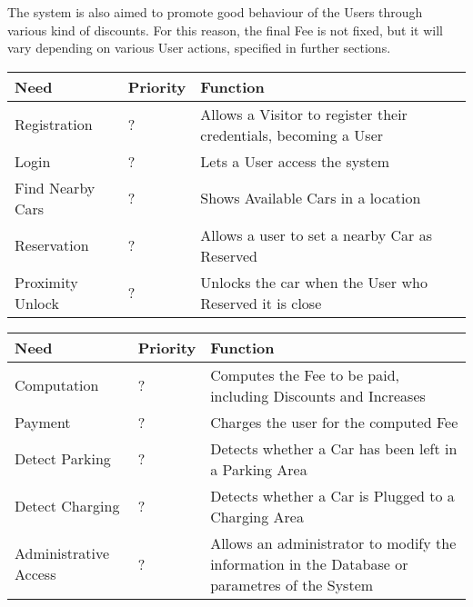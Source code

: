 The system is also aimed to promote good behaviour of the Users through various kind of discounts. For this reason, the final Fee is not fixed, but it will vary depending on various User actions, specified in further sections.

\begin{center}
  \begin{longtable}{|p{}|p{}|p{}|}
    \hline
    \textbf{Need} & \textbf{Priority} & \textbf{Function} \\ \hline
    Registration & ? & Allows a Visitor to register their credentials, becoming a User \\ \hline
    Login & ? & Lets a User access the system \\ \hline
    Find Nearby Cars & ? & Shows Available Cars in a location \\ \hline
    Reservation & ? & Allows a user to set a nearby Car as Reserved \\ \hline
    Proximity Unlock & ? & Unlocks the car when the User who Reserved it is close \\ \hline
  \end{longtable}
\end{center}

\begin{center}
  \begin{longtable}{|p{}|p{}|p{}|}
    \hline
    \textbf{Need} & \textbf{Priority} & \textbf{Function} \\ \hline
    Computation & ? & Computes the Fee to be paid, including Discounts and Increases \\ \hline
    Payment & ? & Charges the user for the computed Fee \\ \hline
    Detect Parking & ? & Detects whether a Car has been left in a Parking Area \\ \hline
    Detect Charging & ? & Detects whether a Car is Plugged to a Charging Area \\ \hline
    Administrative Access & ? & Allows an administrator to modify the information in the Database or parametres of the System \\ \hline
  \end{longtable}
\end{center}


